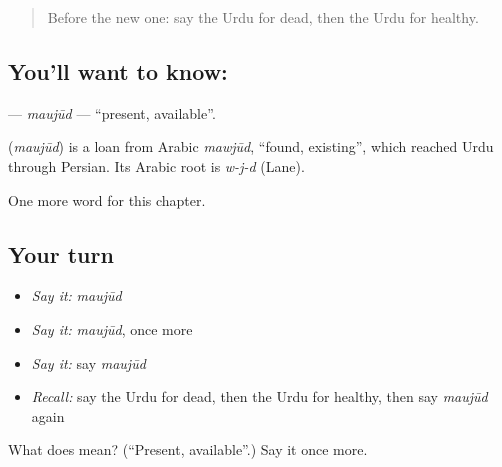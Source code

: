 \label{lesson:UR-C248-maujud}



\begin{quote}
Before the new one: say the Urdu for dead, then the Urdu for healthy.
\end{quote}

\subsection*{You'll want to know: }
\textbf{} — \emph{maujūd} — \textquotedblleft{}present, available\textquotedblright{}.

\begin{cousinweb}
\textbf{} (\emph{maujūd}) is a loan from Arabic \emph{mawjūd}, \textquotedblleft{}found, existing\textquotedblright{}, which reached Urdu through Persian. Its Arabic root is \emph{w-j-d} (Lane).
\end{cousinweb}

\begin{grammarlens}[title={What you've built}]
One more word for this chapter.
\end{grammarlens}

\subsection*{Your turn}
\begin{itemize}
\raggedright
  \item \emph{Say it:} \emph{maujūd}
  \item \emph{Say it:} \emph{maujūd}, once more
  \item \emph{Say it:} say \emph{maujūd}
  \item \emph{Recall:} say the Urdu for dead, then the Urdu for healthy, then say \emph{maujūd} again
\end{itemize}

\begin{tcolorbox}[breakable,colback=teal!4,colframe=teal!35!black,title={Before you move on}]
What does  mean? (\textquotedblleft{}Present, available\textquotedblright{}.) Say it once more.
\end{tcolorbox}
